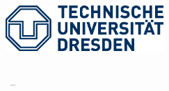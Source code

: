 
\begin{titlepage}

\begin{addmargin}[-1cm]{-3cm}
\begin{center}
\large

\hfill
\vfill

\begingroup
\color{Maroon}\spacedallcaps{\myTitle} \\ \bigskip %
\endgroup
\spacedlowsmallcaps{\mySubtitle} \\ \medskip %


\vfill

%
{
\includegraphics[width=6cm]{figures/tud_logo.eps}
}
\\ \medskip %

\myName \\ %

\myTime\ -- \myVersion %

\vfill

\end{center}
\end{addmargin}

\end{titlepage}
